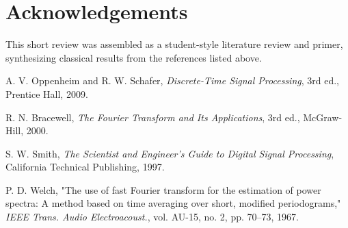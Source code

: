 \documentclass[a4paper]{article}
\begin{document}
\section{Acknowledgements}
This short review was assembled as a student-style literature review and primer, synthesizing classical results from the references listed above.

\begin{thebibliography}{9}
A. V. Oppenheim and R. W. Schafer, \textit{Discrete-Time Signal Processing}, 3rd ed., Prentice Hall, 2009.

R. N. Bracewell, \textit{The Fourier Transform and Its Applications}, 3rd ed., McGraw-Hill, 2000.

S. W. Smith, \textit{The Scientist and Engineer's Guide to Digital Signal Processing}, California Technical Publishing, 1997.

P. D. Welch, "The use of fast Fourier transform for the estimation of power spectra: A method based on time averaging over short, modified periodograms," \textit{IEEE Trans. Audio Electroacoust.}, vol. AU-15, no. 2, pp. 70--73, 1967.

\end{thebibliography}
\end{document}
